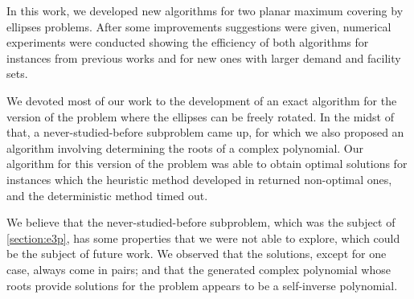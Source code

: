 In this work, we developed new algorithms for two planar maximum covering by ellipses problems.
After some improvements suggestions were given, numerical experiments were conducted showing the efficiency of both algorithms for instances from previous works and for new ones with larger demand and facility sets.

We devoted most of our work to the development of an exact algorithm for the version of the problem where the ellipses can be freely rotated.
In the midst of that, a never-studied-before subproblem came up, for which we also proposed an algorithm involving determining the roots of a complex polynomial.
Our algorithm for this version of the problem was able to obtain optimal solutions for instances which the heuristic method developed in \cite{andreta} returned non-optimal ones, and the deterministic method timed out.

We believe that the never-studied-before subproblem, which was the subject of \autoref{section:e3p}, has some properties that we were not able to explore, which could be the subject of future work. 
We observed that the solutions, except for one case, always come in pairs; and that the generated complex polynomial whose roots provide solutions for the problem appears to be a self-inverse polynomial.